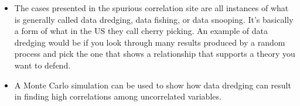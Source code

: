 \documentclass[]{article}
\newenvironment{Shaded}{\begin{snugshade}}{\end{snugshade}}
\newcommand{\CommentTok}[1]{\textcolor[rgb]{0.56,0.35,0.01}{\textit{#1}}}
\newcommand{\DataTypeTok}[1]{\textcolor[rgb]{0.13,0.29,0.53}{#1}}
\newcommand{\DecValTok}[1]{\textcolor[rgb]{0.00,0.00,0.81}{#1}}
\newcommand{\KeywordTok}[1]{\textcolor[rgb]{0.13,0.29,0.53}{\textbf{#1}}}
\newcommand{\NormalTok}[1]{#1}
\newcommand{\OperatorTok}[1]{\textcolor[rgb]{0.81,0.36,0.00}{\textbf{#1}}}
\newcommand{\StringTok}[1]{\textcolor[rgb]{0.31,0.60,0.02}{#1}}
\providecommand{\tightlist}{%
  \setlength{\itemsep}{0pt}\setlength{\parskip}{0pt}}
\begin{document}
\begin{itemize}
\tightlist
\item
  The cases presented in the spurious correlation site are all instances
  of what is generally called data dredging, data fishing, or data
  snooping. It's basically a form of what in the US they call cherry
  picking. An example of data dredging would be if you look through many
  results produced by a random process and pick the one that shows a
  relationship that supports a theory you want to defend.\\
\item
  A Monte Carlo simulation can be used to show how data dredging can
  result in finding high correlations among uncorrelated variables.
\end{itemize}

\begin{Shaded}
\end{Shaded}
\end{document}
